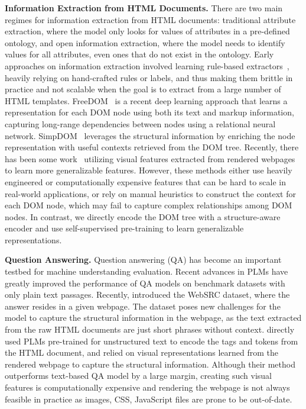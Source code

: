 \documentclass[sigconf, nonacm]{acmart}
\newcommand{\nop}[1]{}
\begin{document}
\noindent\textbf{Information Extraction from HTML Documents.}
There are two main regimes for information extraction from HTML documents: traditional attribute extraction, where the model only looks for values of attributes in a pre-defined ontology, and open information extraction, where the model needs to identify values for all attributes, even ones that do not exist in the ontology. Early approaches on information extraction involved learning rule-based extractors~\cite{gulhane2011web, lockard2018ceres}, heavily relying on hand-crafted rules or labels, and thus making them brittle in practice and not scalable when the goal is to extract from a large number of HTML templates. FreeDOM~\cite{freedom} is a recent deep learning approach that learns a representation for each DOM node using both its text and markup information, capturing long-range dependencies between nodes using a relational neural network. SimpDOM~\cite{zhou2021simplified} leverages the structural information by enriching the node representation with useful contexts retrieved from the DOM tree. Recently, there has been some work~\cite{lockard-etal-2020-zeroshotceres} utilizing visual features extracted from rendered webpages to learn more generalizable features. However, these methods either use heavily engineered or computationally expensive features that can be hard to scale in real-world applications, or rely on manual heuristics to construct the context for each DOM node, which may fail to capture complex relationships among DOM nodes. In contrast, we directly encode the DOM tree with a structure-aware encoder and use self-supervised pre-training to learn generalizable representations. \nop{We should compare/contrast these briefly with our approach. O/w the para is without a point, just a summary of related work.}

\noindent\textbf{Question Answering.}
Question answering (QA) has become an important testbed for machine understanding evaluation. Recent advances in PLMs have greatly improved the performance of QA models on benchmark datasets with only plain text passages. Recently, \citet{chen2021websrc} introduced the WebSRC dataset, where the answer resides in a given webpage. The dataset poses new challenges for the model to capture the structural information in the webpage, as the text extracted from the raw HTML documents are just short phrases without context. \citet{chen2021websrc} directly used PLMs pre-trained for unstructured text to encode the tags and tokens from the HTML document, and relied on visual representations learned from the rendered webpage to capture the structural information. Although their method outperforms text-based QA model by a large margin, creating such visual features is computationally expensive and rendering the webpage is not always feasible in practice as images, CSS, JavaScript files are prone to be out-of-date.
\end{document}
